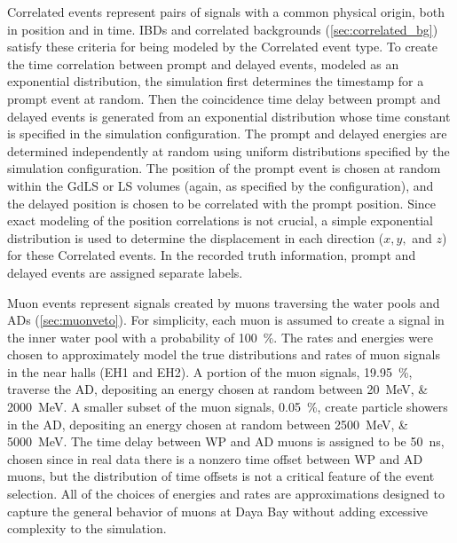 Correlated events represent pairs of signals
with a common physical origin, both in position and in time.
IBDs and correlated backgrounds (\cref{sec:correlated_bg})
satisfy these criteria for being modeled by the Correlated event type.
To create the time correlation between prompt and delayed events,
modeled as an exponential distribution,
the simulation first determines the timestamp for a prompt event at random.
Then the coincidence time delay between prompt and delayed events is generated
from an exponential distribution
whose time constant is specified in the simulation configuration.
The prompt and delayed energies are determined independently at random
using uniform distributions specified by the simulation configuration.
The position of the prompt event is chosen at random
within the GdLS or LS volumes (again, as specified by the configuration),
and the delayed position is chosen to be correlated with the prompt position.
Since exact modeling of the position correlations is not crucial,
a simple exponential distribution is used to determine the displacement
in each direction ($x,y,$ and $z$) for these Correlated events.
In the recorded truth information,
prompt and delayed events are assigned separate labels.

Muon events represent signals created by muons traversing
the water pools and ADs (\cref{sec:muonveto}).
For simplicity, each muon is assumed to create a signal
in the inner water pool with a probability of \SI{100}{\percent}.
The rates and energies were chosen to approximately model
the true distributions and rates of muon signals in the near halls (EH1 and EH2).
A portion of the muon signals, \SI{19.95}{\percent},
traverse the AD, depositing an energy chosen at random between
\SIlist{20;2000}{\MeV}.
A smaller subset of the muon signals, \SI{0.05}{\percent},
create particle showers in the AD, depositing an energy chosen at random between
\SIlist{2500;5000}{\MeV}.
The time delay between WP and AD muons is assigned to be \SI{50}{\ns},
chosen since in real data there is a nonzero time offset between WP and AD muons,
but the distribution of time offsets
is not a critical feature of the event selection.
All of the choices of energies and rates are approximations
designed to capture the general behavior of muons at Daya Bay
without adding excessive complexity to the simulation.


